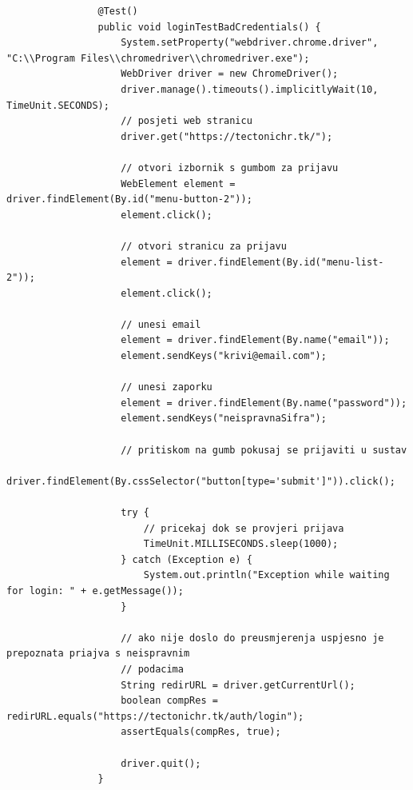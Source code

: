 			\begin{lstlisting}
				@Test()
				public void loginTestBadCredentials() {
					System.setProperty("webdriver.chrome.driver", "C:\\Program Files\\chromedriver\\chromedriver.exe");
					WebDriver driver = new ChromeDriver();
					driver.manage().timeouts().implicitlyWait(10, TimeUnit.SECONDS);
					// posjeti web stranicu
					driver.get("https://tectonichr.tk/");

					// otvori izbornik s gumbom za prijavu
					WebElement element = driver.findElement(By.id("menu-button-2"));
					element.click();

					// otvori stranicu za prijavu
					element = driver.findElement(By.id("menu-list-2"));
					element.click();

					// unesi email
					element = driver.findElement(By.name("email"));
					element.sendKeys("krivi@email.com");

					// unesi zaporku
					element = driver.findElement(By.name("password"));
					element.sendKeys("neispravnaSifra");

					// pritiskom na gumb pokusaj se prijaviti u sustav
					driver.findElement(By.cssSelector("button[type='submit']")).click();

					try {
						// pricekaj dok se provjeri prijava
						TimeUnit.MILLISECONDS.sleep(1000);
					} catch (Exception e) {
						System.out.println("Exception while waiting for login: " + e.getMessage());
					}

					// ako nije doslo do preusmjerenja uspjesno je prepoznata priajva s neispravnim
					// podacima
					String redirURL = driver.getCurrentUrl();
					boolean compRes = redirURL.equals("https://tectonichr.tk/auth/login");
					assertEquals(compRes, true);

					driver.quit();
				}
				\end{lstlisting}

